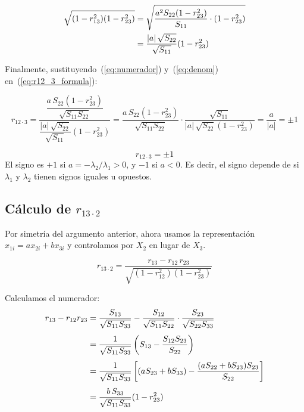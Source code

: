 \documentclass[12pt, letterpaper]{article}
\theoremstyle{remark}
\newcommand{\rp}[2]{r_{#1 \cdot #2}}   %
\begin{document}
\begin{align}
  \sqrt{(1-r_{13}^2)(1-r_{23}^2)}
  &= \sqrt{\frac{a^2 S_{22}(1-r_{23}^2)}{S_{11}} \cdot (1-r_{23}^2)} \notag\\
  &= \frac{|a|\,\sqrt{S_{22}}}{{\sqrt{S_{11}}}} (1-r_{23}^2)
  \label{eq:denom}
\end{align}

Finalmente, sustituyendo~(\ref{eq:numerador}) y~(\ref{eq:denom})
en~(\ref{eq:r12_3_formula}):

\begin{equation}
  \rp{12}{3}
    = \frac{\dfrac{a\,S_{22}(1-r_{23}^2)}{\sqrt{S_{11}S_{22}}}}
           {\dfrac{|a|\,\sqrt{S_{22}}}{\sqrt{S_{11}}}(1-r_{23}^2)}
    = \frac{a\,S_{22}(1-r_{23}^2)}{\sqrt{S_{11}S_{22}}}
      \cdot
      \frac{\sqrt{S_{11}}}{|a|\,\sqrt{S_{22}}(1-r_{23}^2)}
    = \frac{a}{|a|}
    = \pm 1
  \label{eq:r12_3_resultado}
\end{equation}

\begin{clave}
  \[\rp{12}{3} = \pm 1\]
  El signo es $+1$ si $a = -\lambda_2/\lambda_1 > 0$, y $-1$ si $a < 0$.
  Es decir, el signo depende de si $\lambda_1$ y $\lambda_2$ tienen signos
  iguales u opuestos.
\end{clave}

\subsection{Cálculo de \texorpdfstring{$\rp{13}{2}$}{r13.2}}

Por simetría del argumento anterior, ahora usamos la representación
$x_{1i} = ax_{2i} + bx_{3i}$ y controlamos por $X_2$ en lugar de $X_3$.

\begin{equation}
  \rp{13}{2}
    = \frac{r_{13} - r_{12}\,r_{23}}
           {\sqrt{(1-r_{12}^2)(1-r_{23}^2)}}
  \label{eq:r13_2_formula}
\end{equation}

Calculamos el numerador:
\begin{align}
  r_{13} - r_{12} r_{23}
  &= \frac{S_{13}}{\sqrt{S_{11}S_{33}}}
   - \frac{S_{12}}{\sqrt{S_{11}S_{22}}} \cdot \frac{S_{23}}{\sqrt{S_{22}S_{33}}} \notag\\[4pt]
  &= \frac{1}{\sqrt{S_{11}S_{33}}}
     \left(S_{13} - \frac{S_{12}S_{23}}{S_{22}}\right) \notag\\[4pt]
  &= \frac{1}{\sqrt{S_{11}S_{33}}}
     \left[(aS_{23}+bS_{33}) - \frac{(aS_{22}+bS_{23})S_{23}}{S_{22}}\right] \notag\\[4pt]
  &= \frac{b\,S_{33}}{\sqrt{S_{11}S_{33}}}(1 - r_{23}^2)
  \label{eq:num_r13_2}
\end{align}
\end{document}

